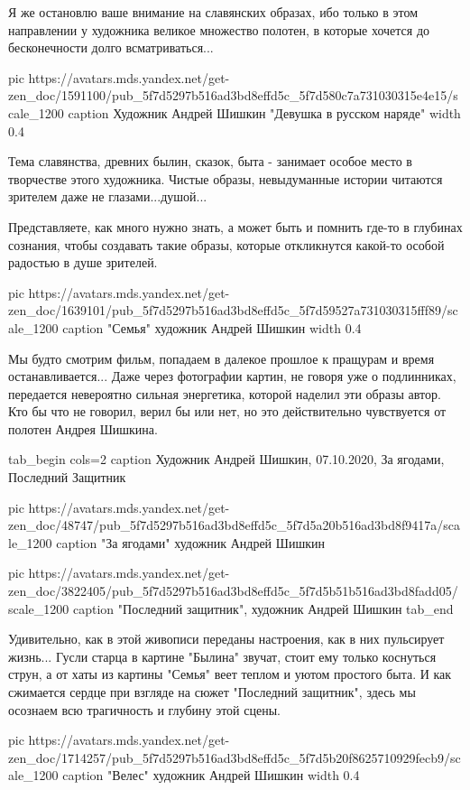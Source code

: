 Я же остановлю ваше внимание на славянских образах, ибо только в этом
направлении у художника великое множество полотен, в которые хочется до
бесконечности долго всматриваться...

\ifcmt
  pic https://avatars.mds.yandex.net/get-zen_doc/1591100/pub_5f7d5297b516ad3bd8effd5c_5f7d580c7a731030315e4e15/scale_1200
	caption Художник Андрей Шишкин "Девушка в русском наряде" 
	width 0.4
\fi

Тема славянства, древних былин, сказок, быта - занимает особое место в
творчестве этого художника. Чистые образы, невыдуманные истории читаются
зрителем даже не глазами...душой...

Представляете, как много нужно знать, а может быть и помнить где-то в глубинах
сознания, чтобы создавать такие образы, которые откликнутся какой-то особой
радостью в душе зрителей.

\ifcmt
  pic https://avatars.mds.yandex.net/get-zen_doc/1639101/pub_5f7d5297b516ad3bd8effd5c_5f7d59527a731030315fff89/scale_1200
	caption "Семья" художник Андрей Шишкин
	width 0.4
\fi

Мы будто смотрим фильм, попадаем в далекое прошлое к пращурам и время
останавливается... Даже через фотографии картин, не говоря уже о подлинниках,
передается невероятно сильная энергетика, которой наделил эти образы автор. Кто
бы что не говорил, верил бы или нет, но это действительно чувствуется от
полотен Андрея Шишкина.

\ifcmt
tab_begin cols=2
	caption Художник Андрей Шишкин, 07.10.2020, За ягодами, Последний Защитник

  pic https://avatars.mds.yandex.net/get-zen_doc/48747/pub_5f7d5297b516ad3bd8effd5c_5f7d5a20b516ad3bd8f9417a/scale_1200
	caption "За ягодами" художник Андрей Шишкин

	pic https://avatars.mds.yandex.net/get-zen_doc/3822405/pub_5f7d5297b516ad3bd8effd5c_5f7d5b51b516ad3bd8fadd05/scale_1200
	caption "Последний защитник", художник Андрей Шишкин
tab_end
\fi

Удивительно, как в этой живописи переданы настроения, как в них пульсирует
жизнь... Гусли старца в картине "Былина" звучат, стоит ему только коснуться
струн, а от хаты из картины "Семья" веет теплом и уютом простого быта. И как
сжимается сердце при взгляде на сюжет "Последний защитник", здесь мы осознаем
всю трагичность и глубину этой сцены.


\ifcmt
  pic https://avatars.mds.yandex.net/get-zen_doc/1714257/pub_5f7d5297b516ad3bd8effd5c_5f7d5b20f8625710929fecb9/scale_1200
	caption "Велес" художник Андрей Шишкин
	width 0.4
\fi

